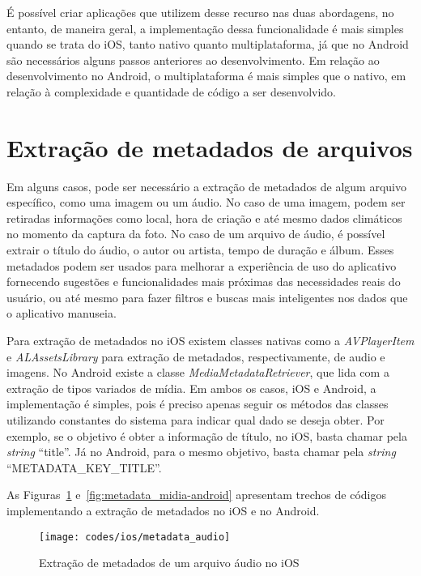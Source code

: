 É possível criar aplicações que utilizem desse recurso nas duas abordagens, no entanto, de maneira geral, a implementação dessa funcionalidade é mais simples quando se trata do iOS, tanto nativo quanto multiplataforma, já 
que no Android são necessários alguns passos anteriores ao desenvolvimento. Em relação ao desenvolvimento no Android, o multiplataforma é mais simples que o nativo, em relação à complexidade e quantidade de código a ser 
desenvolvido.

\section{Extração de metadados de arquivos} \label{subsubsec:extracaometadata}
Em alguns casos, pode ser necessário a extração de metadados de algum arquivo específico, como uma imagem ou um áudio. No caso de uma imagem, podem ser retiradas informações como local, hora de criação e até mesmo 
dados climáticos no momento da captura da foto. No caso de um arquivo de áudio, é possível extrair o título do áudio, o autor ou artista, tempo de duração e álbum. Esses metadados podem ser usados para 
melhorar a experiência de uso do aplicativo fornecendo sugestões e funcionalidades mais próximas das necessidades reais do usuário, ou até mesmo para fazer filtros e buscas mais inteligentes nos dados que o 
aplicativo manuseia. 

Para extração de metadados no iOS existem classes nativas como a \textit{AVPlayerItem} e \textit{ALAssetsLibrary} para extração de metadados, respectivamente, de audio e imagens. No Android existe a 
classe \textit{MediaMetadataRetriever}, que lida com a extração de tipos variados de mídia. Em ambos os casos, iOS e Android, a implementação é simples, pois é preciso apenas seguir os métodos das classes 
utilizando constantes do sistema para indicar qual dado se deseja obter. Por exemplo, se o objetivo é obter a informação de título, no iOS, basta chamar pela \textit{string} ``title''. Já no Android, para o mesmo 
objetivo, basta chamar pela \textit{string} ``METADATA\_KEY\_TITLE''.

As Figuras~\ref{fig:metadata_audio-ios} e~\ref{fig:metadata_midia-android} apresentam trechos de códigos implementando a extração de metadados no iOS e no Android.

\begin{figure}[H]
	\centering
	\texttt{[image: codes/ios/metadata\_audio]}
	\caption[Extração de metadados de um arquivo áudio no iOS]{Extração de metadados de um arquivo áudio no iOS}
	\label{fig:metadata_audio-ios}
\end{figure}

